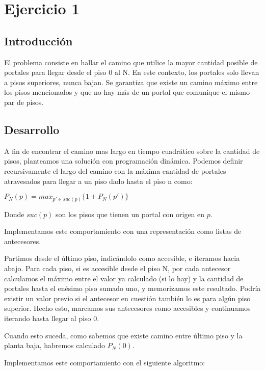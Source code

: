 
\section{Ejercicio 1}
\subsection{Introducción}
El problema consiste en hallar el camino que utilice la mayor cantidad posible de portales para llegar desde el piso 0 al N.
En este contexto, los portales solo llevan a pisos superiores, nunca bajan.
Se garantiza que existe un camino m\'aximo entre los pisos mencionados y que no hay m\'as de un portal que comunique el mismo par de pisos.

\subsection{Desarrollo}
A fin de encontrar el camino mas largo en tiempo cuadrático sobre la cantidad de pisos, planteamos una solución con programación dinámica.
Podemos definir recursivamente el largo del camino con la máxima cantidad de portales atravesados para llegar a un piso dado hasta el piso n como:

\begin{center}
$P_N(p) =max_{p' \in suc(p)}\{ 1 + P_N(p')\}$
\end{center}

Donde $suc(p)$ son los pisos que tienen un portal con origen en $p$.

Implementamos este comportamiento con una representación como listas de antecesores.

Partimos desde el último piso, indicándolo como accesible, e iteramos hacia abajo. 
Para cada piso, si es accesible desde el piso N, por cada antecesor calculamos el máximo entre el valor ya calculado (si lo hay) 
y la cantidad de portales hasta el enésimo piso sumado uno, y memorizamos este resultado. Podría existir un valor previo si el antecesor en cuestión también lo es para algún piso superior.
Hecho esto, marcamos sus antecesores como accesibles y continuamos iterando hasta llegar al piso 0.

Cuando esto suceda, como sabemos que existe camino entre último piso y la planta baja, habremos calculado $P_N(0)$.

Implementamos este comportamiento con el siguiente algoritmo:

